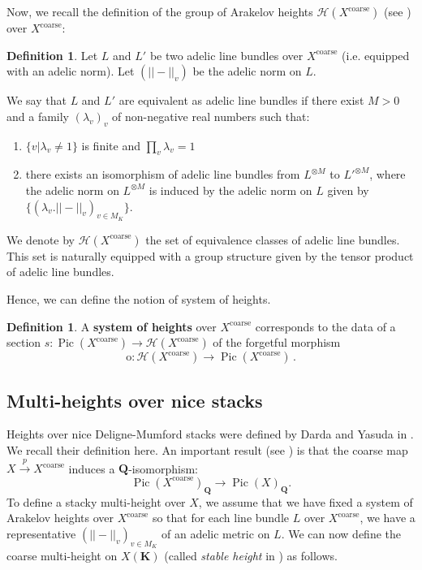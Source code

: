 \documentclass{proc-l}
\newcommand{\K}{\mathbf{K}}
\newcommand{\Q}{\mathbf{Q}}
\DeclareMathOperator{\Pic}{Pic}
\DeclareMathOperator{\coarse}{coarse}
\theoremstyle{definition}
\newtheorem{definition}[theorem]{Definition}
\theoremstyle{remark}
\numberwithin{equation}{section}
\begin{document}
Now, we recall the definition of the group of Arakelov heights $\mathcal{H}(X^{\coarse})$ (see \cite[Definition 4.1]{Peyre_beyond_height}) over $X^{\coarse}$:

\begin{definition}
    Let $L$ and $L'$ be two adelic line bundles over $X^{\coarse}$ (i.e. equipped with an adelic norm). Let $(||-||_v)$ be the adelic norm on $L$.

    We say that $L$ and $L'$ are equivalent as adelic line bundles if there exist $M > 0$ and a family $(\lambda_v)_v$ of non-negative real numbers such that:
    \begin{enumerate}
        \item $\{v | \lambda_v \neq 1\}$ is finite and $\prod\limits_v \lambda_v = 1$
        \item there exists an isomorphism of adelic line bundles from $L^{\otimes M}$ to $L'^{\otimes M} $, where the adelic norm on $L^{\otimes M}$ is induced by the adelic norm on $L$ given by $\{ (\lambda_v . ||-||_v)_{v \in M_K} \} $.
    \end{enumerate}
    We denote by $\mathcal{H}(X^{\coarse})$ the set of equivalence classes of adelic line bundles. This set is naturally equipped with a group structure given by the tensor product of adelic line bundles.
\end{definition}Hence, we can define the notion of system of heights.


\begin{definition}
    A \textbf{system of heights} over $X^{\coarse}$ corresponds to the data of a section $s : \Pic(X^{\coarse}) \rightarrow \mathcal{H}(X^{\coarse})$ of the forgetful morphism $$ \mathrm{o} : \mathcal{H}(X^{\coarse}) \rightarrow \Pic(X^{\coarse}) \, .$$
\end{definition}


\subsection{Multi-heights over nice stacks}

Heights over nice Deligne-Mumford stacks were defined by Darda and Yasuda in \cite{darda2024batyrevmanin}. We recall their definition here. An important result (see \cite[proposition 3.2]{darda2024batyrevmanin}) is that the coarse map $X \xrightarrow{p} X^{\coarse}$ induces a $\Q$-isomorphism:
$$ \Pic(X^{\coarse})_{\Q} \rightarrow \Pic(X)_{\Q}  .$$To define a stacky multi-height over $X$, we assume that we have fixed a system of Arakelov heights over $X^{\coarse}$ so that for each line bundle $L$ over $ X^{\coarse}$, we have a representative $(||-||_v)_{v \in M_K}$ of an adelic metric on $L$. We can now define the coarse multi-height on $X(\K)$ (called \emph{stable height} in \cite{darda2024batyrevmanin}) as follows.
\end{document}
